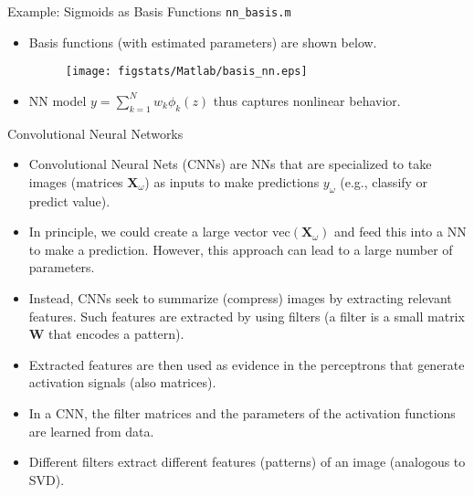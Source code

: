 \documentclass[9pt]{beamer}
\begin{document}
\begin{frame}{Example: Sigmoids as Basis Functions \footnotesize{\texttt{nn\_basis.m}}}

\begin{itemize}
\item Basis functions (with estimated parameters) are shown below. 



\begin{figure}[!htb]
    \centering
	\texttt{[image: figstats/Matlab/basis\_nn.eps]}
\end{figure}

\item NN model $y=\sum_{k=1}^Nw_k\phi_k(z)$ thus captures nonlinear behavior.  
\end{itemize}

\end{frame}

\begin{frame}{Convolutional Neural Networks}

\begin{itemize}
   \setlength{\itemsep}{10pt}
\item Convolutional Neural Nets (CNNs) are NNs that are specialized to take images (matrices $\mathbf{X}_\omega$) as inputs to make predictions $y_\omega$ (e.g., classify or predict value). 
\item In principle, we could create a large vector $\textrm{vec}(\mathbf{X}_\omega)$ and feed this into a NN to make a prediction. However, this approach can lead to a large number of parameters. 
\item Instead, CNNs seek to summarize (compress) images by extracting relevant features. Such features are extracted by using filters (a filter is a small matrix $\mathbf{W}$ that encodes a pattern). 
\item Extracted features are then used as evidence in the perceptrons that generate activation signals (also matrices).
\item In a CNN, the filter matrices and the parameters of the activation functions are learned from data.
\item Different filters extract different features (patterns) of an image (analogous to SVD). 
\end{itemize}


\end{frame}
\end{document}
